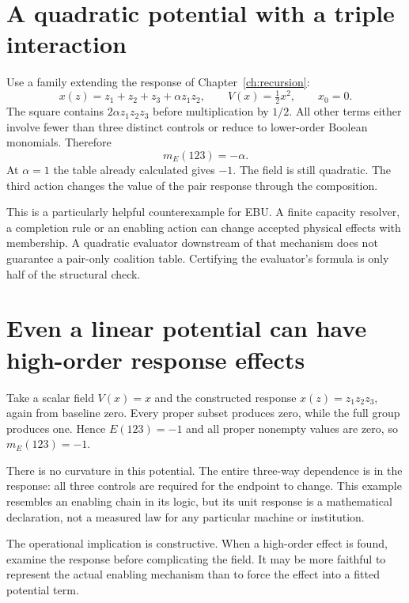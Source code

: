 \section{A quadratic potential with a triple interaction}
Use a family extending the response of Chapter~\ref{ch:recursion}:
\begin{equation}
 x(z)=z_1+z_2+z_3+\alpha z_1z_2,
 \qquad V(x)=\tfrac12x^2,
 \qquad x_0=0.
\end{equation}
The square contains $2\alpha z_1z_2z_3$ before multiplication by $1/2$. All other terms either involve fewer than three distinct controls or reduce to lower-order Boolean monomials. Therefore
\begin{equation}\label{eq:quadratic-nonlinear-triple}
 m_E(123)=-\alpha.
\end{equation}
At $\alpha=1$ the table already calculated gives $-1$. The field is still quadratic. The third action changes the value of the pair response through the composition.

This is a particularly helpful counterexample for EBU. A finite capacity resolver, a completion rule or an enabling action can change accepted physical effects with membership. A quadratic evaluator downstream of that mechanism does not guarantee a pair-only coalition table. Certifying the evaluator's formula is only half of the structural check.

\section{Even a linear potential can have high-order response effects}
Take a scalar field $V(x)=x$ and the constructed response $x(z)=z_1z_2z_3$, again from baseline zero. Every proper subset produces zero, while the full group produces one. Hence $E(123)=-1$ and all proper nonempty values are zero, so $m_E(123)=-1$.

There is no curvature in this potential. The entire three-way dependence is in the response: all three controls are required for the endpoint to change. This example resembles an enabling chain in its logic, but its unit response is a mathematical declaration, not a measured law for any particular machine or institution.

The operational implication is constructive. When a high-order effect is found, examine the response before complicating the field. It may be more faithful to represent the actual enabling mechanism than to force the effect into a fitted potential term.

